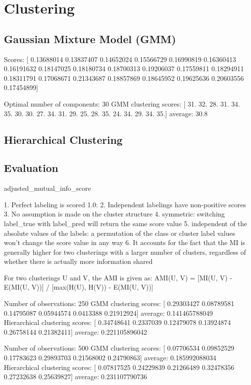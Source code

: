 \chapter*{Clustering}

\section{Gaussian Mixture Model (GMM)}
Scores:  [ 0.13688014  0.13837407  0.14652024  0.15566729  0.16990819  0.16360413
  0.16191632  0.18147025  0.18180734  0.18700313  0.19206037  0.17559811
  0.18294911  0.18311791  0.17068671  0.21343687  0.18857869  0.18645952
  0.19625636  0.20603556  0.17454899]

Optimal number of components:  30
GMM  clustering scores:
  [ 31.  32.  28.  31.  34.  35.  30.  30.  27.  34.  31.  29.  25.  28.  35.
  24.  34.  29.  34.  35.]
average:  30.8

\section{Hierarchical Clustering}

\section{Evaluation}
adjusted_mutual_info_score

1. Perfect labeling is scored 1.0:
2. Independent labelings have non-positive scores
3. No assumption is made on the cluster structure
4. symmetric: switching label_true with label_pred will return the same score value
5. independent of the absolute values of the labels: a permutation of the class or cluster label values won’t change the score value in any way
6. It accounts for the fact that the MI is generally higher for two clusterings with a larger number of clusters, regardless of whether there is actually more information shared

For two clusterings U and V, the AMI is given as:
AMI(U, V) = [MI(U, V) - E(MI(U, V))] / [max(H(U), H(V)) - E(MI(U, V))]

Number of observations:  250
GMM  clustering scores:
  [ 0.29303427  0.08789581  0.14795087  0.05944574  0.0413388   0.21912924]
average:  0.141465788049
Hierarchical  clustering scores:
  [ 0.34748641  0.2337039   0.12479078  0.13924874  0.26758144  0.21382411]
average:  0.221105896042

Number of observations:  500
GMM  clustering scores:
  [ 0.07706534  0.09852529  0.17783623  0.29893703  0.21568002  0.24790863]
average:  0.185992088034
Hierarchical  clustering scores:
  [ 0.07817525  0.24229839  0.21266489  0.32478356  0.27232638  0.25639827]
average:  0.231107790736

